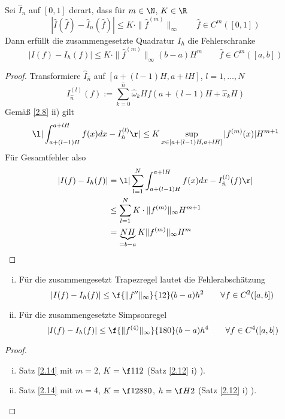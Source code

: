 \documentclass[11pt]{scrartcl}
\begin{document}
\begin{st}
	\label{2.14}
	Sei $\hat I_n$ auf $[0,1]$ derart, dass für $m\in \N$, $K\in \R$
	\[
		|\hat I(\hat f) - \hat I_{\hat n}(\hat f)| \le K \cdot \|\hat f^{(m)}\|_\infty
		\qquad \hat f \in C^m([0,1])		
	\]
	Dann erfüllt die zusammengesetzte Quadratur $I_h$ die Fehlerschranke
	\[
		|I(f) - I_{h}(f)| \le K \cdot \|\hat f^{(m)}\|_\infty (b-a) H^m
		\qquad \hat f \in C^m([a,b])	
	\]
	\begin{proof}
		Transformiere $\hat I_{\hat n}$ auf $[a+(l-1)H, a+lH]$, $l=1,\dotsc,N$
		\[
			I_{\hat n}^{(l)}(f) := \sum_{k=0}^{\hat n} \hat \omega_k H f(a+(l-1)H + \hat x_k H)
		\]
		Gemäß \ref{2.8} ii) gilt
		\[
			\l| \int_{a+(l-1)H}^{a+lH} f(x) dx - I_{\hat n}^{(l)}\r| \le K \sup_{x\in [a+(l-1)H,a+lH]} |f^{(m)}(x)| H^{m+1}
		\]
		Für Gesamtfehler also
		\begin{align*}
			|I(f) - I_h(f)| 
			&= \l| \sum_{l=1}^N \int_{a+(l-1)H}^{a+lH} f(x) dx - I_{\hat n}^{(l)}(f)\r| \\
			&\le \sum_{l=1}^N K \cdot \|f^{(m)}\|_\infty H^{m+1} \\
			&= \underbrace{N H}_{=b-a} K \|f^{(m)}\|_\infty H^m
		\end{align*}
	\end{proof}
\end{st}

\begin{kor}
	\label{2.15}
	\begin{enumerate}[i)]
		\item
			Für die zusammengesetzt Trapezregel lautet die Fehlerabschätzung
			\[
				|I(f) - I_h(f)| \le \f {\|f''\|_{\infty}}{12} (b-a) h^2 \qquad \forall f \in C^2 ([a,b])
			\]
		\item
			Für die zusammengesetzte Simpsonregel
			\[
				|I(f) - I_h(f)| \le \f {\|f^{(4)}\|_\infty}{180} (b-a) h^4 \qquad \forall f \in  C^4([a,b])
			\]
	\end{enumerate}
	\begin{proof}
		\begin{enumerate}[i)]
			\item
				Satz \ref{2.14} mit $m=2$, $K=\f 1{12}$ (Satz \ref{2.12} i) ).
			\item
				Satz \ref{2.14} mit $m=4$, $K=\f 1{2880}$, $h=\f H2$ (Satz \ref{2.12} i) ).
		\end{enumerate}
	\end{proof}
\end{kor}
\end{document}
